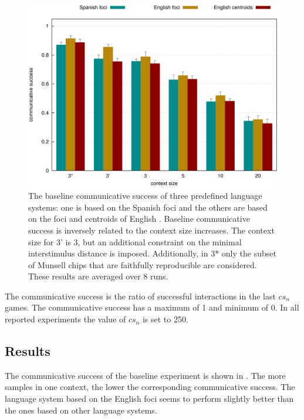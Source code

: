\begin{figure}
  \begin{center}
    \includegraphics[width=.8\textwidth]{./basic-strategy/figures/baseline.pdf}
    \caption[The baseline communicative success of three predefined
    language systems]{The baseline communicative success of three
      predefined language systems: one is based on the Spanish foci
      \citep{lillo07locating} and the others are based on the foci and
      centroids of English \citep{sturges95location}. Baseline
      communicative success is inversely related to the context size
      increases. The context size for 3' is 3, but an additional
      constraint on the minimal interstimulus distance is
      imposed. Additionally, in 3* only the subset of Munsell chips
      that are faithfully reproducible are considered. These results
      are averaged over 8 runs.}
    \label{f:bcs-baseline}
  \end{center}
\end{figure}

The communicative success is
the ratio of
successful interactions in the last $cs_n$ games. The communicative
success has a maximum of 1 and minimum of 0. In all reported
experiments the value of $cs_n$ is set to 250.

\subsection{Results}

The communicative success of the baseline experiment is shown in
. The more samples in one
context, the lower the corresponding communicative success. The
language system based on the English foci seems to perform slightly
better than the ones based on other language systems.


